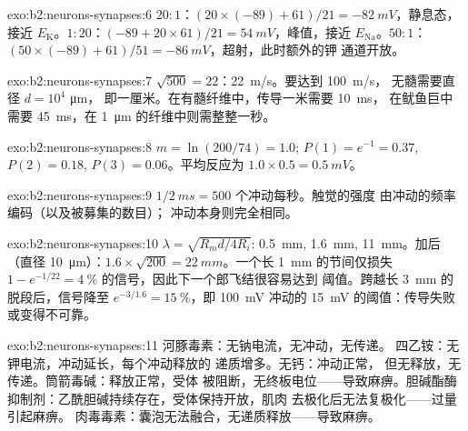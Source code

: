 \begin{solution}{exo:b2:neurons-synapses:6}
$20 : 1$：$(20\times(-89) + 61)/21 = \qty{-82}{mV}$，静息态，
接近 $E_{\mathrm K}$。$1 : 20$：$(-89 + 20\times 61)/21 =
\qty{+54}{mV}$，峰值，接近 $E_{\mathrm{Na}}$。$50 : 1$：$(50\times
(-89) + 61)/51 = \qty{-86}{mV}$，超射，此时额外的钾
通道开放。
\end{solution}

\begin{solution}{exo:b2:neurons-synapses:7}
$\sqrt{500} = 22$：\qty{22}{m/s}。要达到 \qty{100}{m/s}，
无髓需要直径 $d = 10^{4}$ \unit{\micro m}，
即一厘米。在有髓纤维中，传导一米需要 \qty{10}{ms}，
在鱿鱼巨中需要 \qty{45}{ms}，在
\qty{1}{\micro m} 的纤维中则需整整一秒。
\end{solution}

\begin{solution}{exo:b2:neurons-synapses:8}
$m = \ln(200/74) = 1.0$; $P(1) = e^{-1} = 0.37$, $P(2) = 0.18$, $P(3)
= 0.06$。平均反应为 $1.0\times 0.5 = \qty{0.5}{mV}$。
\end{solution}

\begin{solution}{exo:b2:neurons-synapses:9}
$1/\qty{2}{ms} = 500$ 个冲动每秒。触觉的强度
由冲动的频率编码（以及被募集的数目）；
冲动本身则完全相同。
\end{solution}

\begin{solution}{exo:b2:neurons-synapses:10}
$\lambda = \sqrt{R_m d/4R_i}$: \qty{0.5}{mm}, \qty{1.6}{mm},
\qty{11}{mm}。加后（直径 \qty{10}{\micro m}）：$1.6\times\sqrt{200} =
\qty{22}{mm}$。一个长 \qty{1}{mm} 的节间仅损失 $1 - e^{-1/22}
= \qty{4}{\%}$ 的信号，因此下一个郎飞结很容易达到
阈值。跨越长 \qty{3}{mm} 的脱段后，信号降至
$e^{-3/1.6} = \qty{15}{\%}$，即 \qty{100}{mV} 冲动的
\qty{15}{mV} 的阈值：传导失败或变得不可靠。
\end{solution}

\begin{solution}{exo:b2:neurons-synapses:11}
河豚毒素：无钠电流，无冲动，无传递。
四乙铵：无钾电流，冲动延长，每个冲动释放的
递质增多。无钙：冲动正常，
但无释放，无传递。筒箭毒碱：释放正常，受体
被阻断，无终板电位——导致麻痹。胆碱酯酶
抑制剂：乙酰胆碱持续存在，受体保持开放，肌肉
去极化后无法复极化——过量引起麻痹。
肉毒毒素：囊泡无法融合，无递质释放——导致麻痹。
\end{solution}

